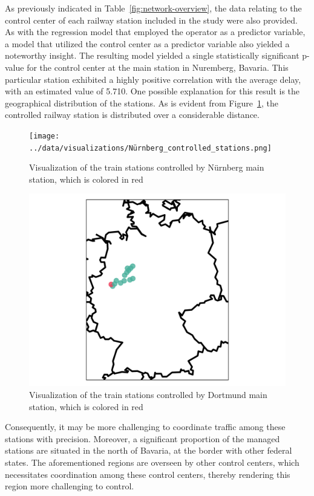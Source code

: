 \documentclass[12pt,a4paper]{article}
\begin{document}
As previously indicated in Table~\ref{fig:network-overview}, the data relating to the control center of each railway station included in the study were also provided.
As with the regression model that employed the operator as a predictor variable, a model that utilized the control center as a predictor variable also yielded a noteworthy insight.
The resulting model yielded a single statistically significant p-value for the control center at the main station in Nuremberg, Bavaria.
This particular station exhibited a highly positive correlation with the average delay, with an estimated value of 5.710. 
One possible explanation for this result is the geographical distribution of the stations. 
As is evident from Figure~\ref{fig:nb-control}, the controlled railway station is distributed over a considerable distance. 

\begin{figure}[h]
  \texttt{[image: ../data/visualizations/Nürnberg\_controlled\_stations.png]}
  \caption{Visualization of the train stations controlled by Nürnberg main station, which is colored in red}
   \label{fig:nb-control}
\end{figure}

\begin{figure}[h]
  \includegraphics[clip=true,width=\columnwidth]{../data/visualizations/Dortmund_controlled_stations.png}
  \caption{Visualization of the train stations controlled by Dortmund main station, which is colored in red}
   \label{fig:do-control}
\end{figure}

Consequently, it may be more challenging to coordinate traffic among these stations with precision. 
Moreover, a significant proportion of the managed stations are situated in the north of Bavaria, at the border with other federal states. 
The aforementioned regions are overseen by other control centers, which necessitates coordination among these control centers, thereby rendering this region more challenging to control.
\end{document}
